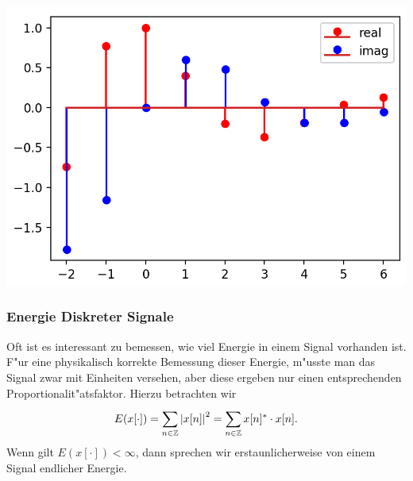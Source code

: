 %
\begin{listing}
    \noindent
    \begin{minipage}{0.49\textwidth}
        \strut\vspace*{-\baselineskip}\newline
        \inputminted[firstline=4]{python3}{code/complex_exp.py}
    \end{minipage}%
    \begin{minipage}{0.49\textwidth}
        \strut\vspace*{-\baselineskip}\newline
        \includegraphics[width=\textwidth]{code/complex_exp.png}
    \end{minipage}
    \label{py:complex_exp}
\end{listing}
%
\subsubsection{Energie Diskreter Signale}

Oft ist es interessant zu bemessen, wie viel Energie in einem Signal vorhanden ist.
F"ur eine physikalisch korrekte Bemessung dieser Energie, m"usste man das Signal zwar mit Einheiten versehen, aber diese ergeben nur einen entsprechenden Proportionalit"atsfaktor.
Hierzu betrachten wir
\begin{equation}\label{eq:disc_sig_energy}
    E(x[\cdot]) 
        = {\sum\limits_{n \in \mathbb{Z}}^{}{{\left| x[n] \right|}^2}} 
        = {\sum\limits_{n \in \mathbb{Z}}^{}{x[n]^\ast \cdot x[n]}}.
\end{equation}
Wenn gilt $E(x[\cdot]) < \infty$, dann sprechen wir erstaunlicherweise von einem Signal endlicher Energie.

